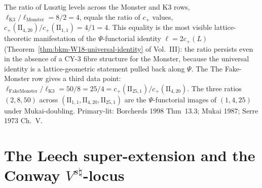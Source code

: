 \begin{remark}[Structural ratio $\ell_{\mathrm{K3}}/\ell_{\mathrm{Monster}} = 4 = c_+(\mathrm{II}_{4,20})/c_+(\mathrm{II}_{1,1})$]
\label{rem:latfnd-w18-witten-ratio-4}
The ratio of Lusztig levels across the Monster and K3 rows,
$\ell_{\mathrm{K3}}/\ell_{\mathrm{Monster}} = 8/2 = 4$, equals the
ratio of $c_+$ values,
$c_+(\mathrm{II}_{4,20})/c_+(\mathrm{II}_{1,1}) = 4/1 = 4$. This
equality is the most visible lattice-theoretic manifestation of
the $\Psi$-functorial identity $\ell = 2c_+(L)$
(Theorem~\ref{thm:bkm-W18-universal-identity}
of Vol.~III): the ratio persists even in the absence of a CY-3
fibre structure for the Monster, because the universal identity is
a lattice-geometric statement pulled back along $\Psi$. The
The Fake-Monster row gives a third data point: $\ell_{\mathrm{FakeMonster}}/\ell_{\mathrm{K3}} =
50/8 = 25/4 = c_+(\mathrm{II}_{25,1})/c_+(\mathrm{II}_{4,20})$.
The three ratios
$(2, 8, 50)$ across $(\mathrm{II}_{1,1}, \mathrm{II}_{4,20},
\mathrm{II}_{25,1})$ are the $\Psi$-functorial images of
$(1, 4, 25)$ under Mukai-doubling.
Primary-lit: Borcherds 1998 Thm~13.3; Mukai 1987; Serre 1973 Ch.~V.
\end{remark}

\section{The Leech super-extension and the Conway $V^{s\natural}$-locus}
\label{sec:latfnd-w19-witten-supplement}

